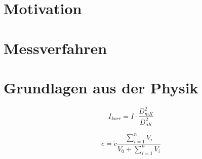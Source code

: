 \section{Motivation}



\section{Messverfahren}



\section{Grundlagen aus der Physik}

\begin{equation}
    I_{korr} = I \cdot \frac{D_{mK}^2}{D_{oK}^2}
    \label{eq:Ikorr}
\end{equation}

\begin{equation}
    c = \tilde{c} \frac{\sum_{i=1}^n V_i}{V_0 + \sum_{i=1}^n V_i}
    \label{eq:Konzentration}
\end{equation}
